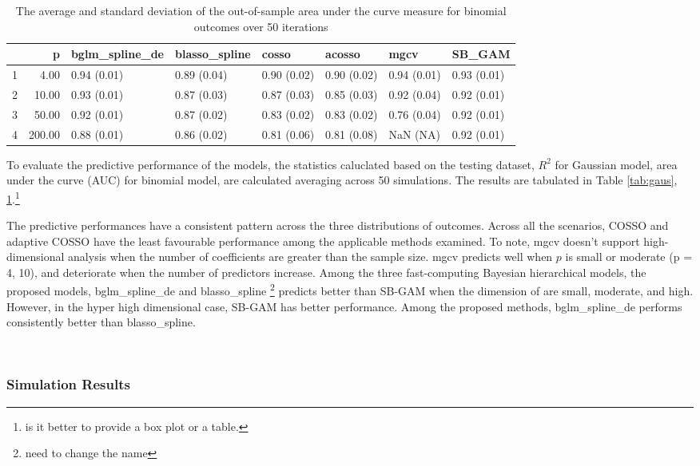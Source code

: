 \documentclass[AMA,STIX1COL,]{WileyNJD-v2}
\begin{document}
\begin{table}[ht]
\centering
\begin{tabular}{rrllllll}
  \hline
 & p & bglm\_spline\_de & blasso\_spline & cosso & acosso & mgcv & SB\_GAM \\ 
  \hline
1 & 4.00 & 0.94 (0.01) & 0.89 (0.04) & 0.90 (0.02) & 0.90 (0.02) & 0.94 (0.01) & 0.93 (0.01) \\ 
  2 & 10.00 & 0.93 (0.01) & 0.87 (0.03) & 0.87 (0.03) & 0.85 (0.03) & 0.92 (0.04) & 0.92 (0.01) \\ 
  3 & 50.00 & 0.92 (0.01) & 0.87 (0.02) & 0.83 (0.02) & 0.83 (0.02) & 0.76 (0.04) & 0.92 (0.01) \\ 
  4 & 200.00 & 0.88 (0.01) & 0.86 (0.02) & 0.81 (0.06) & 0.81 (0.08) & NaN (NA) & 0.92 (0.01) \\ 
   \hline
\end{tabular}
\caption{The average and standard deviation of the out-of-sample area under the curve measure for binomial outcomes over 50 iterations} 
\label{tab:bin_auc}
\end{table}

To evaluate the predictive performance of the models, the statistics
caluclated based on the testing dataset, \(R^2\) for Gaussian model,
area under the curve (AUC) for binomial model, are calculated averaging
across 50 simulations. The results are tabulated in Table
\ref{tab:gaus}, \ref{tab:bin_auc}.\footnote{is it better to provide a
  box plot or a table.}

The predictive performances have a consistent pattern across the three
distributions of outcomes. Across all the scenarios, COSSO and adaptive
COSSO have the least favourable performance among the applicable methods
examined. To note, mgcv doesn't support high-dimensional analysis when
the number of coefficients are greater than the sample size. mgcv
predicts well when \(p\) is small or moderate (p = 4, 10), and
deteriorate when the number of predictors increase. Among the three
fast-computing Bayesian hierarchical models, the proposed models,
bglm\_spline\_de and blasso\_spline \footnote{need to change the name}
predicts better than SB-GAM when the dimension of are small, moderate,
and high. However, in the hyper high dimensional case, SB-GAM has better
performance. Among the proposed methods, bglm\_spline\_de performs
consistently better than blasso\_spline.

~

\hypertarget{simulation-results}{%
\subsubsection{Simulation Results}\label{simulation-results}}
\end{document}
